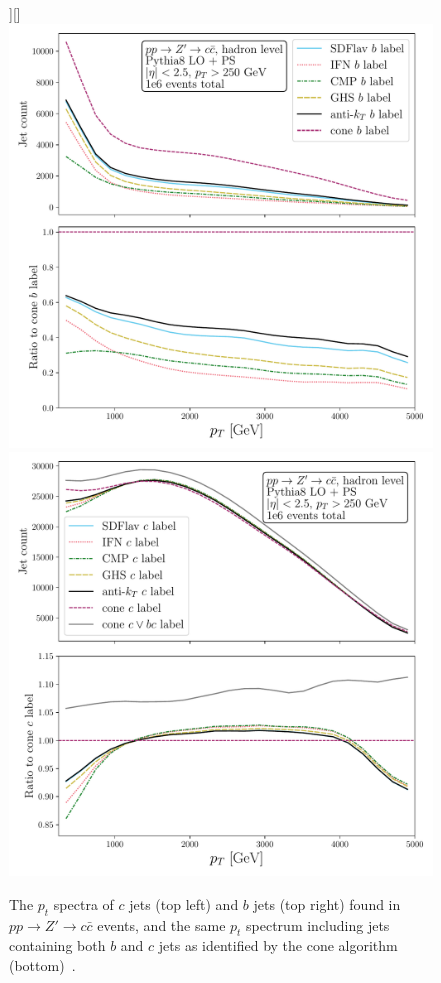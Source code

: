 \documentclass[10pt,a4paper]{book}
\begin{document}
\begin{figure}
    \centering
    \subfloat][\label{or_c}]{\includegraphics[width=0.49\linewidth]{ftag/NETno-grey-line-BLACKANTIKT-MAINCBFN-CMP-ATLAS-compare-pt-with-ratio}}\\
    \subfloat[\label{b_or_c}]\includegraphics[width=0.49\linewidth]{ftag/NETBLACKANTIKT-MAINCIFN-CMP-ATLAS-compare-pt-with-ratio.pdf}
    
    \caption{The $p_t$ spectra of $c$ jets (top left) and $b$ jets (top right) found in $pp \rightarrow Z\prime \rightarrow c \bar{c}$ events, and the same $p_t$ spectrum including jets containing both $b$ and $c$ jets as identified by the cone algorithm (bottom)~\cite{Behring:2025ilo}.}
    \label{fig:ATLAS-FTAG-comparison}
\end{figure}
\end{document}
